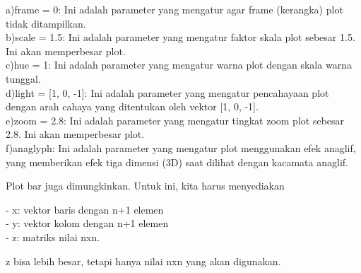 \documentclass[a4paper,10pt]{article}
\begin{document}
\begin{eulernotebook}
\begin{eulercomment}
\begin{eulercomment}
\begin{eulercomment}
\begin{eulercomment}
\begin{eulercomment}
\begin{eulercomment}
\begin{eulercomment}
\begin{eulercomment}
\begin{eulercomment}
a)frame = 0: Ini adalah parameter yang mengatur agar frame (kerangka)
plot tidak ditampilkan.\\
b)scale = 1.5: Ini adalah parameter yang mengatur faktor skala plot
sebesar 1.5. Ini akan memperbesar plot.\\
c)hue = 1: Ini adalah parameter yang mengatur warna plot dengan skala
warna tunggal.\\
d)light = [1, 0, -1]: Ini adalah parameter yang mengatur pencahayaan
plot dengan arah cahaya yang ditentukan oleh vektor [1, 0, -1].\\
e)zoom = 2.8: Ini adalah parameter yang mengatur tingkat zoom plot
sebesar 2.8. Ini akan memperbesar plot.\\
f)anaglyph: Ini adalah parameter yang mengatur plot menggunakan efek
anaglif, yang memberikan efek tiga dimensi (3D) saat dilihat dengan
kacamata anaglif.\\
\end{eulercomment}
\begin{eulercomment}
Plot bar juga dimungkinkan. Untuk ini, kita harus menyediakan

- x: vektor baris dengan n+1 elemen\\
- y: vektor kolom dengan n+1 elemen\\
- z: matriks nilai nxn.

z bisa lebih besar, tetapi hanya nilai nxn yang akan digunakan.


\end{eulercomment}
\end{eulercomment}
\end{eulercomment}
\end{eulercomment}
\end{eulercomment}
\end{eulercomment}
\end{eulercomment}
\end{eulercomment}
\end{eulercomment}
\end{eulernotebook}
\end{document}
